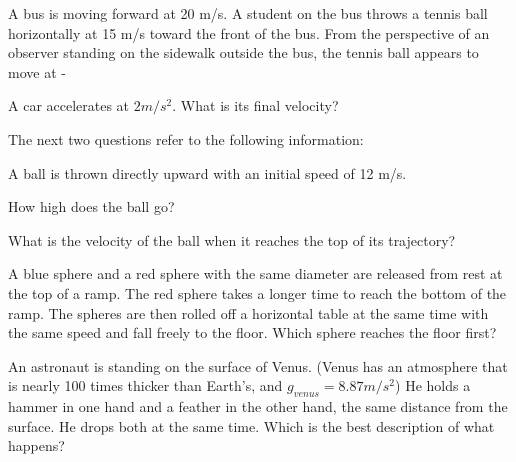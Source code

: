 \documentclass[10pt]{examdesign}
\begin{document}
\begin{multiplechoice} [title={Multiple Choice},
	rearrange=yes]
\begin{question}
A bus is moving forward at 20 m/s.  A student on the bus throws a tennis ball horizontally at 15 m/s toward the front of the bus.  From the perspective of an observer standing on the sidewalk outside the bus, the tennis ball appears to move at - 
	\end{question}

\begin{question}
	A car accelerates at $2 m/s^2$.  What is its final velocity?
\end{question}

\begin{block}
The next two questions refer to the following information:

	A ball is thrown directly upward with an initial speed of 12 m/s. 
	
\begin{question}
  How high does the ball go?
\end{question}

\begin{question}
What is the velocity of the ball when it reaches the top of its trajectory?

	\end{question}



\end{block}

\begin{question}
A blue sphere and a red sphere with the same diameter are released from rest at the top of a ramp. The red sphere takes a longer time to reach the bottom of the ramp. The spheres are then rolled off a horizontal table at the same time with the same speed and fall freely to the floor. Which sphere reaches the floor first? 
\end{question}

\begin{question}
	An astronaut is standing on the surface of Venus.  (Venus has an atmosphere that is nearly 100 times thicker than Earth's, and $g_{venus} = 8.87 m/s^2$)  He holds a hammer in one hand and a feather in the other hand, the same distance from the surface.  He drops both at the same time.  Which is the best description of what happens?
\end{question}




\end{multiplechoice}
\end{document}
